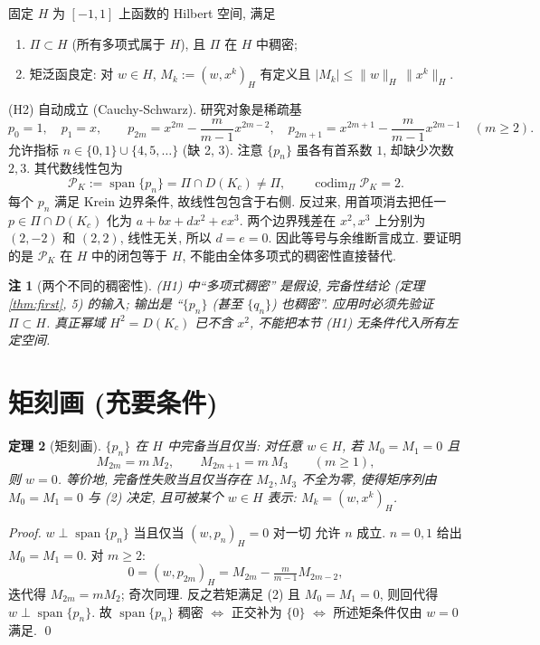 \documentclass[UTF8]{ctexart}
\newtheorem{theorem}{定理}[section]
\newtheorem{remark}[theorem]{注}
\begin{document}
固定 $H$ 为 $[-1,1]$ 上函数的 Hilbert 空间, 满足
\begin{enumerate}
	\item[(H1)] $\Pi \subset H$ (所有多项式属于 $H$), 且 $\Pi$ 在 $H$ 中稠密;
	\item[(H2)] 矩泛函良定: 对 $w \in H$, $M_k := (w, x^k)_H$ 有定义且
		$|M_k| \leq \|w\|_H\, \|x^k\|_H$.
\end{enumerate}
(H2) 自动成立 (Cauchy-Schwarz). 研究对象是稀疏基
\begin{equation}
	p_0 = 1, \quad p_1 = x, \qquad
	p_{2m} = x^{2m} - \frac{m}{m-1} x^{2m-2}, \quad
	p_{2m+1} = x^{2m+1} - \frac{m}{m-1} x^{2m-1} \quad (m \geq 2).
\end{equation}
允许指标 $n \in \{0,1\} \cup \{4,5,\dots\}$ (缺 2, 3). 注意 $\{p_n\}$
虽各有首系数 $1$, 却缺少次数 $2,3$. 其代数线性包为
\[
 \mathcal P_K:=\operatorname{span}\{p_n\}=\Pi\cap D(K_c)\ne\Pi,
 \qquad \operatorname{codim}_{\Pi}\mathcal P_K=2.
\]
每个 $p_n$ 满足 Krein 边界条件, 故线性包包含于右侧.
反过来, 用首项消去把任一 $p\in\Pi\cap D(K_c)$ 化为
$a+bx+dx^2+ex^3$. 两个边界残差在 $x^2,x^3$ 上分别为
$(2,-2)$ 和 $(2,2)$, 线性无关, 所以 $d=e=0$.
因此等号与余维断言成立. 要证明的是 $\mathcal P_K$ 在 $H$ 中的闭包等于 $H$,
不能由全体多项式的稠密性直接替代.

\begin{remark}[两个不同的稠密性]
	(H1) 中``多项式稠密'' 是假设, 完备性结论 (定理 \ref{thm:first}, 5) 的输入; 输出是
	``$\{p_n\}$ (甚至 $\{q_n\}$) 也稠密''. 应用时必须先验证
	$\Pi\subset H$. 真正幂域 $H^2=D(K_c)$ 已不含 $x^2$,
	不能把本节 (H1) 无条件代入所有左定空间.
\end{remark}

\section{矩刻画 (充要条件)}

\begin{theorem}[矩刻画]\label{thm:moments}
	$\{p_n\}$ 在 $H$ 中完备当且仅当: 对任意 $w \in H$, 若
	$M_0 = M_1 = 0$ 且
	\begin{equation}
		M_{2m} = m\, M_2, \qquad M_{2m+1} = m\, M_3 \qquad (m \geq 1),
	\end{equation}
	则 $w = 0$. 等价地, 完备性失败当且仅当存在 $M_2, M_3$ 不全为零,
	使得矩序列由 $M_0 = M_1 = 0$ 与 (2) 决定, 且可被某个 $w \in H$ 表示: $M_k = (w, x^k)_H$.
\end{theorem}

\begin{proof}
	$w \perp \operatorname{span}\{p_n\}$ 当且仅当 $(w, p_n)_H = 0$ 对一切
	允许 $n$ 成立. $n = 0, 1$ 给出 $M_0 = M_1 = 0$. 对 $m \geq 2$:
	\[
		0 = (w, p_{2m})_H = M_{2m} - \tfrac{m}{m-1} M_{2m-2},
	\]
	迭代得 $M_{2m} = mM_2$; 奇次同理. 反之若矩满足 (2) 且 $M_0 = M_1 = 0$,
	则回代得 $w \perp \operatorname{span}\{p_n\}$. 故
	$\operatorname{span}\{p_n\}$ 稠密 $\iff$ 正交补为 $\{0\}$
	$\iff$ 所述矩条件仅由 $w = 0$ 满足. \qed
\end{proof}
\end{document}

